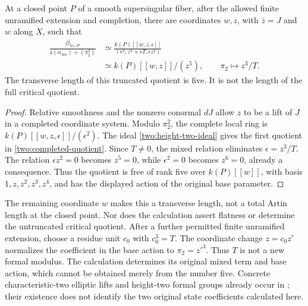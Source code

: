 \begin{corollary}
\label{two:length}
At a closed point $P$ of a smooth supersingular fiber, after
the allowed finite unramified extension and completion, there
are coordinates $w,z$, with $\bar z=J$ and $w$ along $X$,
such that
\begin{equation}
 \begin{split}
 \frac{\widehat{\mathcal O}_{\mathcal U_2,P}}
       {\mathfrak c(\alpha_{4m})+(\pi_2^2)}
 &\simeq
 \frac{k(P)[[w,z,\epsilon]]}
      {(\epsilon^2,z^3+\epsilon T,\epsilon z^2)}\\
 &\simeq k(P)[[w,z]]/(z^5),\qquad
 \pi_2\longmapsto z^3/T.
 \end{split}
 \label{two:completed-quotient}
\end{equation}
The transverse length of this truncated quotient is five.
It is not the length of the full critical quotient.
\end{corollary}

\begin{proof}
Relative smoothness and the nonzero conormal $dJ$ allow
$z$ to be a lift of $J$ in a completed coordinate system.
Modulo $\pi_2^2$, the complete local ring is
$k(P)[[w,z,\epsilon]]/(\epsilon^2)$. The ideal
\eqref{two:height-two-ideal} gives the first quotient in
\eqref{two:completed-quotient}. Since $T\ne0$, the mixed
relation eliminates $\epsilon=z^3/T$. The relation
$\epsilon z^2=0$ becomes $z^5=0$, while $\epsilon^2=0$
becomes $z^6=0$, already a consequence. Thus the quotient
is free of rank five over $k(P)[[w]]$, with basis
$1,z,z^2,z^3,z^4$, and has the displayed action of the
original base parameter.
\end{proof}

The remaining coordinate $w$ makes this a transverse length,
not a total Artin length at the closed point. Nor does the
calculation assert flatness or determine the untruncated
critical quotient. After a further permitted finite unramified
extension, choose a residue unit $c_0$ with $c_0^3=T$.
The coordinate change $z=c_0z'$ normalizes the coefficient
in the base action to $\pi_2=z'^3$. Thus $T$ is not a new
formal modulus. The calculation determines its original
mixed term and base action, which cannot be obtained merely
from the number five. Concrete characteristic-two elliptic
lifts and height-two formal groups already occur in
\cite[\S3.5]{LubinTate1966}; their existence does not identify
the two original state coefficients calculated here.

